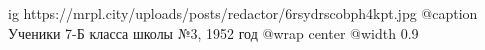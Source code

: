  
 
 
 
 

\ifcmt
  ig https://mrpl.city/uploads/posts/redactor/6rsydrscobph4kpt.jpg
	@caption Ученики 7-Б класса школы №3, 1952 год
  @wrap center
  @width 0.9
\fi
